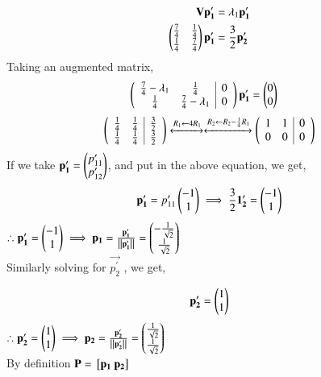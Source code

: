 \documentclass[journal]{IEEEtran}
\begin{document}
\begin{align}
	\mathbf{V}\mathbf{p_1^\prime} &= \lambda_1 \mathbf{p_1^\prime} \\
	\begin{pmatrix}\frac{7}{4} & \frac{1}{4} \\ \frac{1}{4} & \frac{7}{4}\end{pmatrix} \mathbf{p_1^\prime}  &= \frac{3}{2}\mathbf{p_2^\prime} \\
\end{align}
Taking an augmented matrix,
\begin{align}
	\left(
	\begin{array}{cc|c}
		\frac{7}{4} - \lambda_1 & \frac{1}{4} & 0\\ 
		\frac{1}{4} & \frac{7}{4} - \lambda_1& 0
	\end{array}\right)\mathbf{p_1^\prime}  &=  \begin{pmatrix}0 \\ 0\end{pmatrix} 
\end{align}
\begin{align}
	\left(
	\begin{array}{cc|c}
		\frac{1}{4} & \frac{1}{4} & \frac{3}{2}\\ 
		\frac{1}{4} & \frac{1}{4} & \frac{3}{2}
	\end{array}\right)
	\xleftrightarrow[]{R_1 \leftarrow {4 R_1}}
	\xleftrightarrow[]{R_2 \leftarrow {R_2-\frac{1}{4}R_1}}
	\left(
	\begin{array}{cc|c}
		1 & 1 & 0\\ 
		0 & 0 & 0
		\end{array}\right)
\end{align}
If we take $\mathbf{p_1^\prime}  = \begin{pmatrix}p_{11}^\prime \\ p_{12}^\prime\end{pmatrix}$, and put in the above equation, we get,
\begin{align}
	\mathbf{p_1^\prime} = p_{11}^\prime \begin{pmatrix}-1 \\ 1\end{pmatrix} \implies\frac{3}{2} \mathbf{1_2^\prime} =  \begin{pmatrix}-1 \\ 1\end{pmatrix}
\end{align}
$\therefore \mathbf{p_1^\prime}  = \begin{pmatrix}-1 \\ 1\end{pmatrix} \implies \mathbf{p_1} = \frac{\mathbf{p_1^\prime} }{\left\lVert\mathbf{p_1^\prime}\right\rVert}  = \begin{pmatrix} -\frac{1}{\sqrt{2}} \\ \frac{1}{\sqrt{2}}\end{pmatrix}$ \\
Similarly solving for $\vec{p_2^\prime}$ , we get,

\begin{align}
	\mathbf{p_2^\prime} &=  \begin{pmatrix}1 \\ 1\end{pmatrix} \\
\end{align} 
$\therefore \mathbf{p_2^\prime}  = \begin{pmatrix}1 \\ 1\end{pmatrix} \implies \mathbf{p_2} = \frac{\mathbf{p_2^\prime} }{\left\lVert\mathbf{p_2^\prime}\right\rVert}  = \begin{pmatrix} \frac{1}{\sqrt{2}} \\ \frac{1}{\sqrt{2}}\end{pmatrix}$ \\
By definition $\mathbf{P} = {}\left[\mathbf{p_1} ~ \mathbf{p_2}\right]$ \\ 
\end{document}
